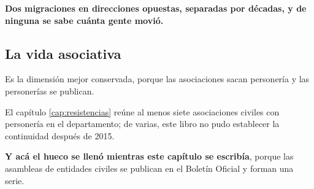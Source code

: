 \textbf{Dos migraciones en direcciones opuestas, separadas por décadas, y de ninguna se sabe
cuánta gente movió.}

\subsection*{La vida asociativa}

Es la dimensión mejor conservada, porque las asociaciones sacan personería y las personerías se
publican.

El capítulo \ref{cap:resistencias} reúne al menos siete asociaciones civiles con personería en el departamento; de varias, este libro no pudo establecer la continuidad después de 2015.

\textbf{Y acá el hueco se llenó mientras este capítulo se escribía}, porque las asambleas de
entidades civiles se publican en el Boletín Oficial y forman una serie.

